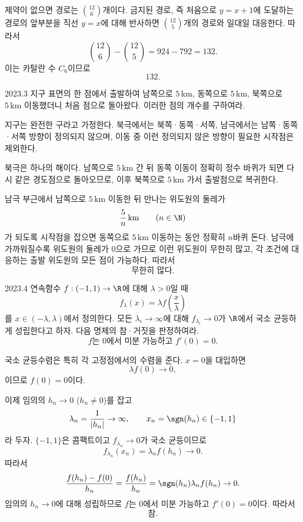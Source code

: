 \begin{solution}
제약이 없으면 경로는 $\binom{12}{6}$개이다. 금지된 경로, 즉 처음으로 $y=x+1$에 도달하는 경로의 앞부분을 직선 $y=x$에 대해 반사하면 $\binom{12}{5}$개의 경로와 일대일 대응한다. 따라서
\[
\binom{12}{6}-\binom{12}{5}
=924-792
=132.
\]
이는 카탈란 수 $C_6$이므로
\[
\boxed{132}.
\]
\end{solution}

\begin{pastproblem}{2023.3}
지구 표면의 한 점에서 출발하여 남쪽으로 $5\,\mathrm{km}$, 동쪽으로 $5\,\mathrm{km}$, 북쪽으로 $5\,\mathrm{km}$ 이동했더니 처음 점으로 돌아왔다. 이러한 점의 개수를 구하여라.

지구는 완전한 구라고 가정한다. 북극에서는 북쪽·동쪽·서쪽, 남극에서는 남쪽·동쪽·서쪽 방향이 정의되지 않으며, 이동 중 이런 정의되지 않은 방향이 필요한 시작점은 제외한다.
\end{pastproblem}

\begin{solution}
북극은 하나의 해이다. 남쪽으로 $5\,\mathrm{km}$ 간 뒤 동쪽 이동이 정확히 정수 바퀴가 되면 다시 같은 경도점으로 돌아오므로, 이후 북쪽으로 $5\,\mathrm{km}$ 가서 출발점으로 복귀한다.

남극 부근에서 남쪽으로 $5\,\mathrm{km}$ 이동한 뒤 만나는 위도원의 둘레가
\[
\frac5n\,\mathrm{km}\qquad(n\in\N)
\]
가 되도록 시작점을 잡으면 동쪽으로 $5\,\mathrm{km}$ 이동하는 동안 정확히 $n$바퀴 돈다. 남극에 가까워질수록 위도원의 둘레가 $0$으로 가므로 이런 위도원이 무한히 많고, 각 조건에 대응하는 출발 위도원의 모든 점이 가능하다. 따라서
\[
\boxed{\text{무한히 많다}}.
\]
\end{solution}

\begin{pastproblem}{2023.4}
연속함수 $f:(-1,1)\to\R$에 대해 $\lambda>0$일 때
\[
f_\lambda(x)=\lambda f\left(\frac{x}{\lambda}\right)
\]
를 $x\in(-\lambda,\lambda)$에서 정의한다. 모든 $\lambda_i\to\infty$에 대해 $f_{\lambda_i}\to0$가 $\R$에서 국소 균등하게 성립한다고 하자. 다음 명제의 참·거짓을 판정하여라.
\[
f\text{는 }0\text{에서 미분 가능하고 }f'(0)=0.
\]
\end{pastproblem}

\begin{solution}
국소 균등수렴은 특히 각 고정점에서의 수렴을 준다. $x=0$을 대입하면
\[
\lambda f(0)\to0,
\]
이므로 $f(0)=0$이다.

이제 임의의 $h_n\to0$ ($h_n\ne0$)를 잡고
\[
\lambda_n=\frac1{|h_n|}\to\infty,
\qquad
x_n=\sgn(h_n)\in\{-1,1\}
\]
라 두자. $\{-1,1\}$은 콤팩트이고 $f_{\lambda_n}\to0$가 국소 균등이므로
\[
f_{\lambda_n}(x_n)=\lambda_n f(h_n)\to0.
\]
따라서
\[
\frac{f(h_n)-f(0)}{h_n}
=\frac{f(h_n)}{h_n}
=\sgn(h_n)\lambda_n f(h_n)
\to0.
\]
임의의 $h_n\to0$에 대해 성립하므로 $f$는 $0$에서 미분 가능하고 $f'(0)=0$이다. 따라서
\[
\boxed{\text{참}}.
\]
\end{solution}

